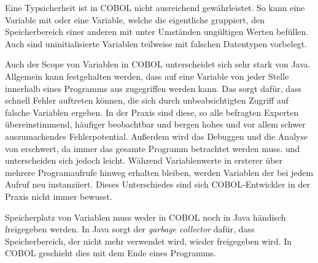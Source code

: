 Eine Typsicherheit ist in COBOL nicht ausreichend gewährleistet. So kann eine Variable mit  oder eine Variable, welche die eigentliche gruppiert, den Speicherbereich einer anderen mit unter Umständen ungültigen Werten befüllen. Auch sind uninitialisierte Variablen teilweise mit falschen Datentypen vorbelegt. 

Auch der Scope von Variablen in COBOL unterscheidet sich sehr stark von Java. Allgemein kann festgehalten werden, dass auf eine Variable von jeder Stelle innerhalb eines Programms aus zugegriffen werden kann. Das sorgt dafür, dass schnell Fehler auftreten können, die sich durch unbeabsichtigten Zugriff auf falsche Variablen ergeben. In der Praxis sind diese, so alle befragten Experten übereinstimmend, häufiger beobachtbar und bergen hohes und vor allem schwer auszumachendes Fehlerpotential. Außerdem wird das Debuggen und die Analyse von erschwert, da immer das gesamte Programm betrachtet werden muss.  und  unterscheiden sich jedoch leicht. Während Variablenwerte in ersterer über mehrere Programaufrufe hinweg erhalten bleiben, werden Variablen der  bei jedem Aufruf neu instanziiert. Dieses Unterschiedes sind sich COBOL-Entwickler in der Praxis nicht immer bewusst.

Speicherplatz von Variablen muss weder in COBOL noch in Java händisch freigegeben werden. In Java sorgt der \textit{garbage collector} dafür, dass Speicherbereich, der nicht mehr verwendet wird, wieder freigegeben wird. In COBOL geschieht dies mit dem Ende eines Programms. 